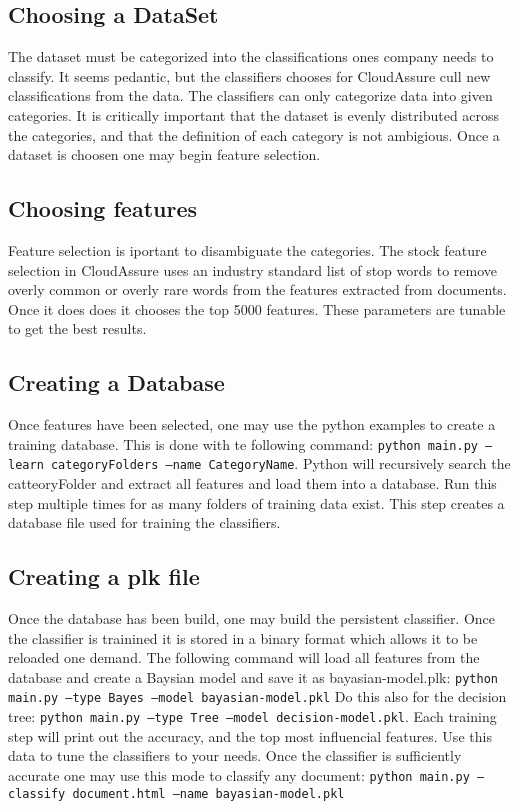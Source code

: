 \subsection{Choosing a DataSet}
The dataset must be categorized into the classifications ones company needs to
classify. It seems pedantic, but the classifiers chooses for CloudAssure cull
new classifications from the data. The classifiers can only categorize data into
given categories. It is critically important that the dataset is evenly distributed across the
categories, and that the definition of each category is not ambigious. 
Once a dataset is choosen one may begin feature selection.

\subsection{Choosing features}
Feature selection is iportant to disambiguate the categories. The stock feature
selection in CloudAssure uses an industry standard list of stop words to remove
overly common or overly rare words from the features extracted from documents.
Once it does does it chooses the top 5000 features. These parameters are tunable
 to get the best results.

\subsection{Creating a Database}
Once features have been selected, one may use the python examples to create
a training database. This is done with te following command: 
\texttt{python main.py --learn categoryFolders --name CategoryName}. Python
will recursively search the catteoryFolder and extract all features and load
them into a database. Run this step multiple times for as many folders of
training data exist. This step creates a database file used for training the
classifiers.

\subsection{Creating a plk file}
Once the database has been build, one may build the persistent classifier. Once
the classifier is trainined it is stored in a binary format which allows it to
be reloaded one demand. The following command will load all features from the
database and create a Baysian model and save it as bayasian-model.plk: 
\texttt{python main.py --type Bayes --model bayasian-model.pkl}
Do this also for the decision tree: \texttt{python main.py --type Tree --model
decision-model.pkl}. Each training step will print out the accuracy, and the top
most influencial features. Use this data to tune the classifiers to your needs.
Once the classifier is sufficiently accurate one may use this mode to classify
any document: \texttt{python main.py --classify document.html --name bayasian-model.pkl}

